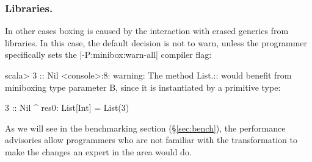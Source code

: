 \subsubsection{Libraries.} In other cases boxing is caused by the interaction with erased generics from libraries. In this case, the default decision is not to warn, unless the programmer specifically sets the |-P:minibox:warn-all| compiler flag:

\begin{lstlisting-nobreak}
 scala> 3 :: Nil
 <console>:8: warning: The method List.:: would benefit from miniboxing type parameter B, since it is instantiated by a primitive type:

               3 :: Nil
                 ^
 res0: List[Int] = List(3)
\end{lstlisting-nobreak}

As we will see in the benchmarking section (\S\ref{sec:bench}), the performance advisories allow programmers who are not familiar with the transformation to make the changes an expert in the area would do.


